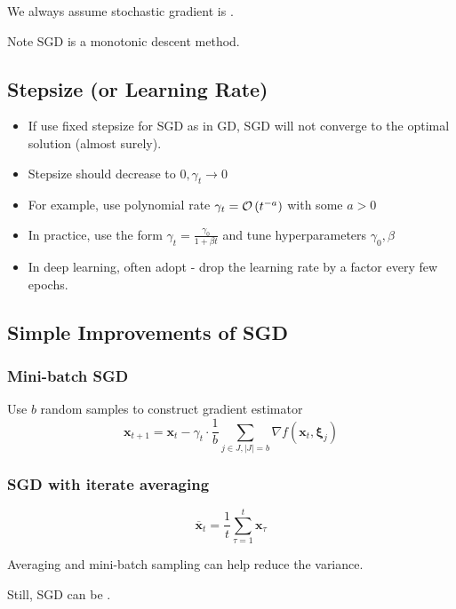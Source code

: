 We always assume stochastic gradient is .

Note SGD is  a monotonic descent method.




\subsection*{Stepsize (or Learning Rate)}
\begin{itemize}[leftmargin=*]
    \item If use fixed stepsize for SGD as in GD, SGD will not converge to the optimal solution (almost surely).
    \item Stepsize should decrease to $0, \gamma_{t} \rightarrow 0$
    \item For example, use polynomial rate $\gamma_{t}=\operatorname{\mathcal{O}} \left(t^{-a}\right)$ with some $a>0$
    \item In practice, use the form $\gamma_{t}=\frac{\gamma_{0}}{1+\beta t}$ and tune hyperparameters $\gamma_{0}, \beta$
    \item In deep learning, often adopt  - drop the learning rate by a factor every few epochs.
\end{itemize}






\subsection*{Simple Improvements of SGD}
\subsubsection*{Mini-batch SGD}
Use $b$ random samples to construct gradient estimator
$$
\mathbf{x}_{t+1}=\mathbf{x}_{t}-\gamma_{t} \cdot \frac{1}{b} \sum_{j \in J,|J|=b} \nabla f\left(\mathbf{x}_{t}, \boldsymbol{\xi}_{j}\right)
$$
\subsubsection*{SGD with iterate averaging}
$$
\overline{\mathbf{x}}_{t}=\frac{1}{t} \sum_{\tau=1}^{t} \mathbf{x}_{\tau}
$$

Averaging and mini-batch sampling can help reduce the variance. 

Still, SGD can be .






